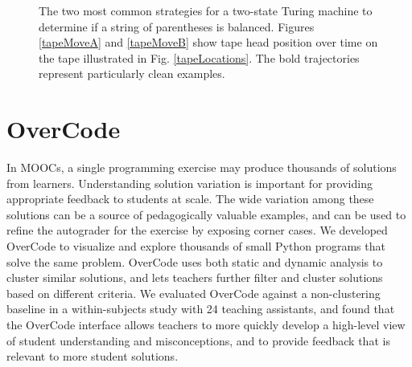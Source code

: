 \begin{figure}[p]

\caption{The two most common strategies for a two-state Turing machine to determine if a string of parentheses is balanced. Figures \ref{tapeMoveA} and \ref{tapeMoveB} show tape head position over time on the tape illustrated in Fig. \ref{tapeLocations}. The bold trajectories represent particularly clean examples.}
\label{turingFig}
\end{figure}



\section{OverCode}

In MOOCs, a single programming exercise may produce thousands of solutions from learners. Understanding solution variation is important for providing appropriate feedback to students at scale. The wide variation among these solutions can be a source of pedagogically valuable examples, and can be used to refine the autograder for the exercise by exposing corner cases. We developed OverCode to visualize and explore thousands of small Python programs that solve the same problem. OverCode uses both static and dynamic analysis to cluster similar solutions, and lets teachers further filter and cluster solutions based on different criteria. We evaluated OverCode against a non-clustering baseline in a within-subjects study with 24 teaching assistants, and found that the OverCode interface allows teachers to more quickly develop a high-level view of student understanding and misconceptions, and to provide feedback that is relevant to more student solutions.


